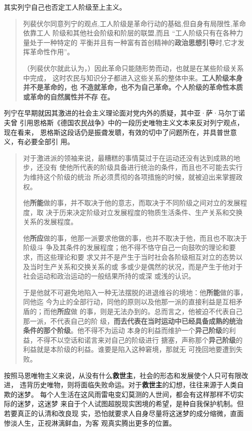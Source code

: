 其实列宁自己也否定工人阶级至上主义。
\begin{quotation}
  列裴伏尔同意列宁的观点,工人阶级是革命行动的基础,但自身有局限性,革命依靠工人
  阶级和其他社会阶级和阶层的联盟,而且 “工人阶级只有在各种力量处于一种特定的
  平衡并且有一种富有首创精神的\textbf{政治思想引导}时,它才发挥革命性作用”。\cite{zhangxiaoyi}

  （列裴伏尔就此认为，）因此革命只能随形势而动，也就是在某些阶级关系中完成，
  这时农民与知识分子都进入这些关系的整体中来。\textbf{工人阶级本身并不是革命的，也
    不造就革命，也不为自己革命。个人阶级的革命性本质或革命的自然属性并不存
    在。}
\end{quotation}

列宁在早期就因其激进的社会主义理论面对党内外的质疑，其中亚·萨·马尔丁诺夫曾
引用恩格斯《德国农民战争》中的一段历史唯物主义文本来反对列宁观点，现在看来，
恩格斯这段话仍是振聋发聩，有效的切中了问题所在，并具普世意义，有必要全部引
用。

\begin{quotation}
  对于激进派的领袖来说，最糟糕的事情莫过于在运动还没有达到成熟的地步，还没有
  使他所代表的阶级具备进行统治的条件，而且也不可能去实行为维持这个阶级的统治
  所必须贯彻的各项措施的时候，就被迫出来掌握政权。

  他\textbf{所能}做的事，并不取决于他的意志，而取决于不同阶级之间对立的发展程度，取
  决于历来决定阶级对立发展程度的物质生活条件、生产关系和交换关系的发展程度。

  他\textbf{所应}做的事，他那一派要求他做的事，也并不取决于他，而且也不取决于阶级斗
  争及其条件的发展程度；他不得不恪守自己一向鼓吹的理论和要求，而这些理论和要
  求又并不是产生于当时社会各阶级相互对立的态势以及当时生产关系和交换关系的或
  多或少是偶然的状况，而是产生于他对于社会运动和政治运动的一般结果所持的或深
  或浅的认识。

  于是他就不可避免地陷入一种无法摆脱的进退维谷的境地：他\textbf{所能}做的事，同他迄
  今为止的全部行动，同他的原则以及他那一派的直接利益是互相矛盾的；而他\textbf{所应}做
  的事，则是无法办到的。总而言之，他被迫不代表自己那一派，不代表自己的阶
  级，\textbf{而去代表在当时运动中已经具备成熟的统治条件的那个阶级}。他不得不为运动
  本身的利益而维护一个\textbf{异己阶级}的利益，不得不以空话和诺言来对自己的阶级进行
  搪塞，声称那个\textbf{异己阶级}的利益就是本阶级的利益。谁要是陷入这种窘境，那就无
  可挽回地要遭到失败。
\end{quotation}

按照马恩唯物主义来说，从没有什么\textbf{救世主}，社会的形态和发展使个人只可有限改进，
违背历史唯物，则将面临失败命运。对于\textbf{救世主}的幻想，往往来源于人类自欺的迷梦。
每个人生活在这风雨雷电变幻莫测的人世间，都会有这样那样不切实际的迷梦，这迷梦
来自于个人试图超脱现实困境的希望，是种自我保护机制。但若要真正的认清和改良现
实，恐怕就要求人自身尽量将这迷梦的成分缩微，直面惨淡人生，正视淋漓鲜血，为客
观真实腾出更多的位置。



